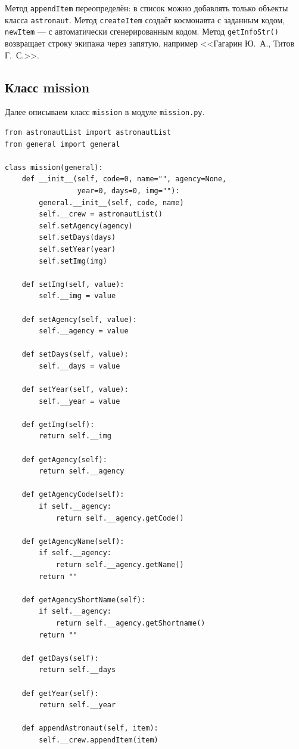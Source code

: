 \documentclass[a4paper,14pt]{extarticle}
\begin{document}
Метод \texttt{appendItem} переопределён: в список можно добавлять только объекты класса \texttt{astronaut}. Метод \texttt{createItem} создаёт космонавта с заданным кодом, \texttt{newItem} --- с автоматически сгенерированным кодом. Метод \texttt{getInfoStr()} возвращает строку экипажа через запятую, например <<Гагарин Ю.~А., Титов Г.~С.>>.

\subsection{Класс mission}

Далее описываем класс \texttt{mission} в модуле \texttt{mission.py}.

\begin{lstlisting}[caption={Модуль \texttt{mission.py}}]
from astronautList import astronautList
from general import general

class mission(general):
    def __init__(self, code=0, name="", agency=None,
                 year=0, days=0, img=""):
        general.__init__(self, code, name)
        self.__crew = astronautList()
        self.setAgency(agency)
        self.setDays(days)
        self.setYear(year)
        self.setImg(img)

    def setImg(self, value):
        self.__img = value

    def setAgency(self, value):
        self.__agency = value

    def setDays(self, value):
        self.__days = value

    def setYear(self, value):
        self.__year = value

    def getImg(self):
        return self.__img

    def getAgency(self):
        return self.__agency

    def getAgencyCode(self):
        if self.__agency:
            return self.__agency.getCode()

    def getAgencyName(self):
        if self.__agency:
            return self.__agency.getName()
        return ""

    def getAgencyShortName(self):
        if self.__agency:
            return self.__agency.getShortname()
        return ""

    def getDays(self):
        return self.__days

    def getYear(self):
        return self.__year

    def appendAstronaut(self, item):
        self.__crew.appendItem(item)


\end{lstlisting}
\end{document}

